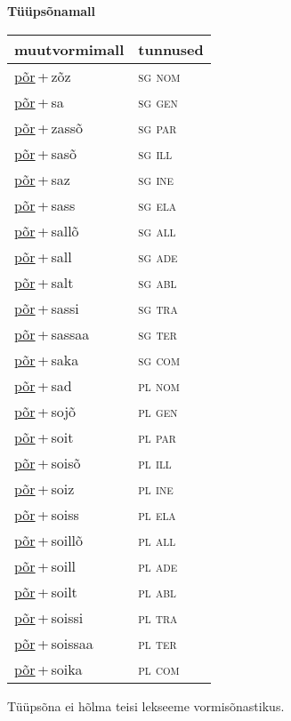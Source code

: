 
\vspace{1.8em}
\begin{minipage}{\textwidth}
\textbf{Tüüpsõnamall \,}\\

\begin{sideways}
\begin{tabular}{l l}
muutvormimall & tunnused \\
\hline
\underline{põr}\,+\,zõz & \textsc{ sg nom } \\
\underline{põr}\,+\,sa & \textsc{ sg gen } \\
\underline{põr}\,+\,zassõ & \textsc{ sg par } \\
\underline{põr}\,+\,sasõ & \textsc{ sg ill } \\
\underline{põr}\,+\,saz & \textsc{ sg ine } \\
\underline{põr}\,+\,sass & \textsc{ sg ela } \\
\underline{põr}\,+\,sallõ & \textsc{ sg all } \\
\underline{põr}\,+\,sall & \textsc{ sg ade } \\
\underline{põr}\,+\,salt & \textsc{ sg abl } \\
\underline{põr}\,+\,sassi & \textsc{ sg tra } \\
\underline{põr}\,+\,sassaa & \textsc{ sg ter } \\
\underline{põr}\,+\,saka & \textsc{ sg com } \\
\underline{põr}\,+\,sad & \textsc{ pl nom } \\
\underline{põr}\,+\,sojõ & \textsc{ pl gen } \\
\underline{põr}\,+\,soit & \textsc{ pl par } \\
\underline{põr}\,+\,soisõ & \textsc{ pl ill } \\
\underline{põr}\,+\,soiz & \textsc{ pl ine } \\
\underline{põr}\,+\,soiss & \textsc{ pl ela } \\
\underline{põr}\,+\,soillõ & \textsc{ pl all } \\
\underline{põr}\,+\,soill & \textsc{ pl ade } \\
\underline{põr}\,+\,soilt & \textsc{ pl abl } \\
\underline{põr}\,+\,soissi & \textsc{ pl tra } \\
\underline{põr}\,+\,soissaa & \textsc{ pl ter } \\
\underline{põr}\,+\,soika & \textsc{ pl com } \\
\end{tabular}
\end{sideways}
\label{tab:tüüpsõnamall-põrzõz}

\end{minipage}

 
\vspace{1em}
\noindent Tüüpsõna ei hõlma teisi lekseeme vormi\-sõnastikus.

